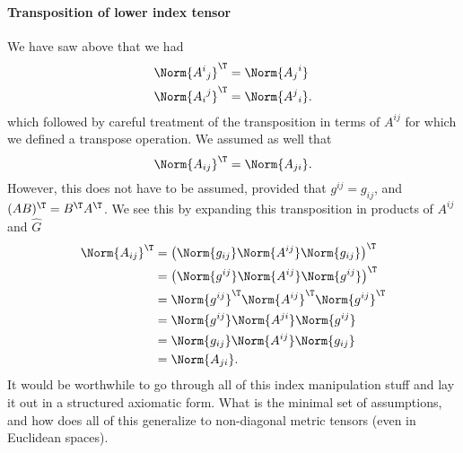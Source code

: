%
%
%
%
%
\paragraph{Transposition of lower index tensor}
%
We have saw above that we had
%
\begin{equation}\label{eqn:relativisticElectrodynamicsL11:1022}
\begin{aligned}
\Norm{ {A^{i}}_j }^\T &= \Norm{ {A_{j}}^i } \\
\Norm{ {A_{i}}^j }^\T &= \Norm{ {A^{j}}_i }.
\end{aligned}
\end{equation}
%
which followed by careful treatment of the transposition in terms of \(A^{i j}\) for which we defined a transpose operation.  We assumed as well that
%
\begin{equation}\label{eqn:relativisticElectrodynamicsL11:1042}
\Norm{ A_{i j} }^\T = \Norm{ A_{j i} }.
\end{equation}
%
However, this does not have to be assumed, provided that \(g^{i j} = g_{i j}\), and \((AB)^\T = B^\T A^\T\).  We see this by expanding this transposition in products of \(A^{i j}\) and \(\hat{G}\)
%
\begin{equation}\label{eqn:relativisticElectrodynamicsL11b:1480}
\begin{aligned}
\Norm{ A_{i j} }^\T
&= \left( \Norm{g_{i j}} \Norm{ A^{i j} } \Norm{g_{i j}} \right)^\T \\
&= \left( \Norm{g^{i j}} \Norm{ A^{i j} } \Norm{g^{i j}} \right)^\T \\
&= \Norm{g^{i j}}^\T \Norm{ A^{i j}}^\T \Norm{g^{i j}}^\T \\
&= \Norm{g^{i j}} \Norm{ A^{j i}} \Norm{g^{i j}} \\
&= \Norm{g_{i j}} \Norm{ A^{i j}} \Norm{g_{i j}} \\
&= \Norm{ A_{j i}}.
\end{aligned}
\end{equation}
%
It would be worthwhile to go through all of this index manipulation stuff and lay it out in a structured axiomatic form.  What is the minimal set of assumptions, and how does all of this generalize to non-diagonal metric tensors (even in Euclidean spaces).
%

